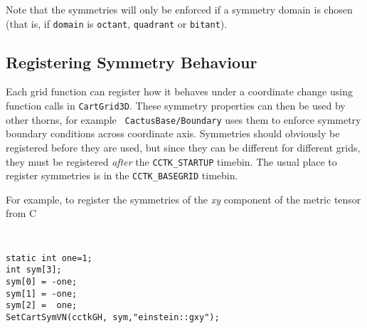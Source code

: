 \documentclass{article}
\begin{document}
Note that the symmetries will only be enforced if a 
symmetry domain is chosen (that is, if 
{\tt domain} is {\tt octant}, {\tt quadrant} or {\tt bitant}).

\subsection{Registering Symmetry Behaviour}

Each grid function can register how it behaves under a coordinate
change using function calls in {\tt CartGrid3D}. These symmetry
properties can then be used by other thorns, for example {\tt
CactusBase/Boundary} uses them to enforce symmetry boundary conditions
across coordinate axis. Symmetries should obviously be registered
before they are used, but since they can be different for different grids, 
they must be registered {\it after} the {\tt CCTK\_STARTUP} timebin. The
usual place to register symmetries is in the {\tt CCTK\_BASEGRID} timebin.

For example, to register the symmetries of the {\it xy} component of the
metric tensor from C

{\tt
\begin{verbatim}
static int one=1;
int sym[3];
sym[0] = -one;
sym[1] = -one;
sym[2] =  one;
SetCartSymVN(cctkGH, sym,"einstein::gxy");
\end{verbatim}
}




\end{document}
